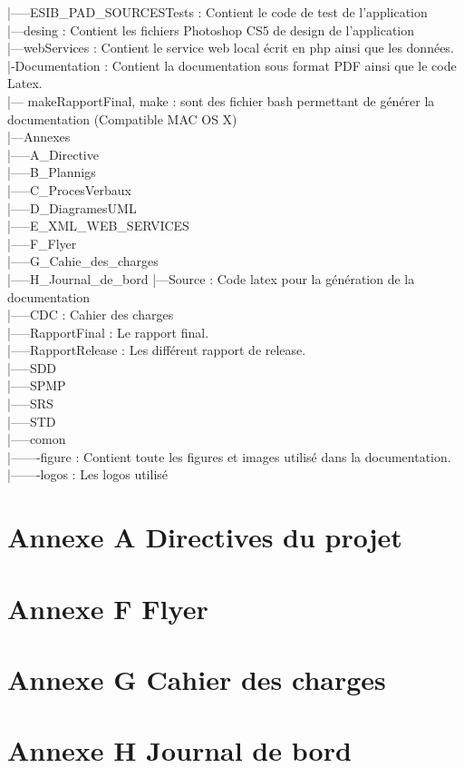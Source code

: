 \documentclass[12pt,a4paper,twoside]{report}
\begin{document}
 |-----ESIB\_PAD\_SOURCESTests : Contient le code de test de l'application\\
 |---desing : Contient les fichiers Photoshop CS5 de design de l'application\\
 |---webServices : Contient le service web local écrit en php ainsi que les données.\\
 |-Documentation : Contient la documentation sous format PDF ainsi que le code Latex. \\
 |--- makeRapportFinal, make : sont des fichier bash permettant de générer la documentation (Compatible MAC OS X)\\
 |---Annexes\\
 |-----A\_Directive\\
 |-----B\_Plannigs\\
 |-----C\_ProcesVerbaux\\
 |-----D\_DiagramesUML\\
 |-----E\_XML\_WEB\_SERVICES\\
 |-----F\_Flyer\\
 |-----G\_Cahie\_des\_charges\\
 |-----H\_Journal\_de\_bord
 |---Source : Code latex pour la génération de la documentation\\
 |-----CDC : Cahier des charges\\
 |-----RapportFinal : Le rapport final.\\
 |-----RapportRelease : Les différent rapport de release.\\
 |-----SDD \\
 |-----SPMP\\
 |-----SRS\\
 |-----STD\\
 |-----comon\\
 |-------figure : Contient toute les figures et images utilisé dans la documentation.\\
 |-------logos : Les logos utilisé\\



\cleardoublepage
\chapter*{Annexe A \- Directives du projet}
\cleardoublepage
\chapter*{Annexe F \- Flyer}
\cleardoublepage
\chapter*{Annexe G \- Cahier des charges}

\cleardoublepage
\chapter*{Annexe H \- Journal de bord}


%

%
\end{document}
